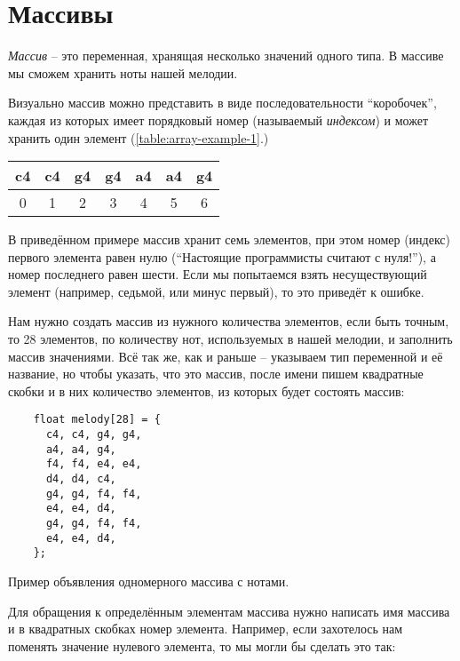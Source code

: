 \documentclass[../sparc.tex]{subfiles}
\begin{document}
\section{Массивы}

\emph{Массив} -- это переменная, хранящая несколько значений одного типа.  В
массиве мы сможем хранить ноты нашей мелодии.

Визуально массив можно представить в виде последовательности ``коробочек'',
каждая из которых имеет порядковый номер (называемый \emph{индексом}) и может
хранить один элемент (\ref{table:array-example-1}.)

\begin{tabular}{|p{1cm}|p{1cm}|p{1cm}|p{1cm}|p{1cm}|p{1cm}|p{1cm}|}
  \hline
  c4 & c4 & g4 & g4 & a4 & a4 & g4 \\
  \hline
  \multicolumn{1}{c}{0}
  & \multicolumn{1}{c}{1}
  & \multicolumn{1}{c}{2}
  & \multicolumn{1}{c}{3}
  & \multicolumn{1}{c}{4}
  & \multicolumn{1}{c}{5}
  & \multicolumn{1}{c}{6}
  \label{table:array-example-1}
\end{tabular}

В приведённом примере массив хранит семь элементов, при этом номер (индекс)
первого элемента равен нулю (``Настоящие программисты считают с нуля!''), а
номер последнего равен шести. Если мы попытаемся взять несуществующий элемент
(например, седьмой, или минус первый), то это приведёт к ошибке.

Нам нужно создать массив из нужного количества элементов, если быть точным, то
28 элементов, по количеству нот, используемых в нашей мелодии, и заполнить
массив значениями. Всё так же, как и раньше -- указываем тип переменной и её
название, но чтобы указать, что это массив, после имени пишем квадратные скобки
и в них количество элементов, из которых будет состоять массив:

\begin{listing}[ht]
  \begin{verbatim}
    float melody[28] = {
      c4, c4, g4, g4,
      a4, a4, g4,
      f4, f4, e4, e4,
      d4, d4, c4,
      g4, g4, f4, f4,
      e4, e4, d4,
      g4, g4, f4, f4,
      e4, e4, d4,
    };
  \end{verbatim}
  \label{listing:music-array-example-1}
  \caption{Пример объявления одномерного массива с нотами.}
\end{listing}

Для обращения к определённым элементам массива нужно написать имя массива и в
квадратных скобках номер элемента. Например, если захотелось нам поменять
значение нулевого элемента, то мы могли бы сделать это так:
\end{document}
